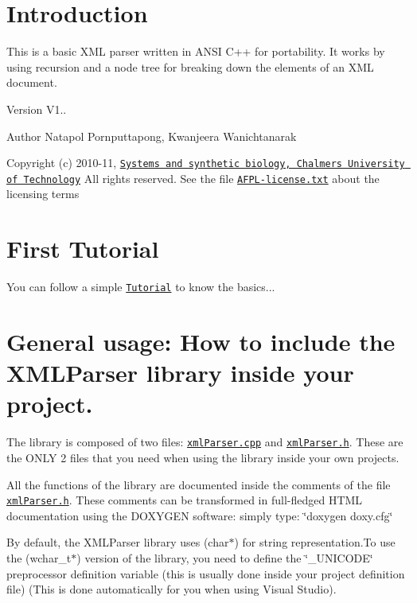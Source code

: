 \hypertarget{index_intro_sec}{}\section{Introduction}\label{index_intro_sec}
This is a basic X\-M\-L parser written in A\-N\-S\-I C++ for portability. It works by using recursion and a node tree for breaking down the elements of an X\-M\-L document.

\begin{DoxyVersion}{Version}
V1.. 
\end{DoxyVersion}
\begin{DoxyAuthor}{Author}
Natapol Pornputtapong, Kwanjeera Wanichtanarak
\end{DoxyAuthor}
Copyright (c) 2010-\/11, \href{http://www.sysbio.se}{\tt Systems and synthetic biology, Chalmers University of Technology} All rights reserved. See the file \href{../../AFPL-license.txt}{\tt A\-F\-P\-L-\/license.\-txt} about the licensing terms\hypertarget{index_tutorial}{}\section{First Tutorial}\label{index_tutorial}
You can follow a simple \href{../../xmlParser.html}{\tt Tutorial} to know the basics...\hypertarget{index_usage}{}\section{General usage\-: How to include the X\-M\-L\-Parser library inside your project.}\label{index_usage}
The library is composed of two files\-: \href{../../xmlParser.cpp}{\tt xml\-Parser.\-cpp} and \href{../../xmlParser.h}{\tt xml\-Parser.\-h}. These are the O\-N\-L\-Y 2 files that you need when using the library inside your own projects.

All the functions of the library are documented inside the comments of the file \href{../../xmlParser.h}{\tt xml\-Parser.\-h}. These comments can be transformed in full-\/fledged H\-T\-M\-L documentation using the D\-O\-X\-Y\-G\-E\-N software\-: simply type\-: \char`\"{}doxygen doxy.\-cfg\char`\"{}

By default, the X\-M\-L\-Parser library uses (char$\ast$) for string representation.\-To use the (wchar\-\_\-t$\ast$) version of the library, you need to define the \char`\"{}\-\_\-\-U\-N\-I\-C\-O\-D\-E\char`\"{} preprocessor definition variable (this is usually done inside your project definition file) (This is done automatically for you when using Visual Studio). 